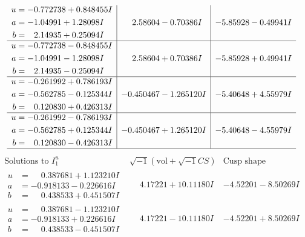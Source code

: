 \documentclass[1p]{elsarticle_modified}
\theoremstyle{definition}
\newcommand{\I}{\sqrt{-1}}
\begin{document}
$$\begin{array}{c|c|c}
\begin{aligned}
u &= -0.772738 + 0.848455 I \\
a &= -1.04991 + 1.28098 I \\
b &= \phantom{-}2.14935 + 0.25094 I\end{aligned}
 & \phantom{-}2.58604 - 0.70386 I & -5.85928 - 0.49941 I \\ \hline\begin{aligned}
u &= -0.772738 - 0.848455 I \\
a &= -1.04991 - 1.28098 I \\
b &= \phantom{-}2.14935 - 0.25094 I\end{aligned}
 & \phantom{-}2.58604 + 0.70386 I & -5.85928 + 0.49941 I \\ \hline\begin{aligned}
u &= -0.261992 + 0.786193 I \\
a &= -0.562785 - 0.125344 I \\
b &= \phantom{-}0.120830 + 0.426313 I\end{aligned}
 & -0.450467 - 1.265120 I & -5.40648 + 4.55979 I \\ \hline\begin{aligned}
u &= -0.261992 - 0.786193 I \\
a &= -0.562785 + 0.125344 I \\
b &= \phantom{-}0.120830 - 0.426313 I\end{aligned}
 & -0.450467 + 1.265120 I & -5.40648 - 4.55979 I\\
 \hline 
 \end{array}$$\newpage$$\begin{array}{c|c|c}  
\text{Solutions to }I^u_{1}& \I (\text{vol} + \sqrt{-1}CS) & \text{Cusp shape}\\
 \hline 
\begin{aligned}
u &= \phantom{-}0.387681 + 1.123210 I \\
a &= -0.918133 - 0.226616 I \\
b &= \phantom{-}0.438533 + 0.451507 I\end{aligned}
 & \phantom{-}4.17221 + 10.11180 I & -4.52201 - 8.50269 I \\ \hline\begin{aligned}
u &= \phantom{-}0.387681 - 1.123210 I \\
a &= -0.918133 + 0.226616 I \\
b &= \phantom{-}0.438533 - 0.451507 I\end{aligned}
 & \phantom{-}4.17221 - 10.11180 I & -4.52201 + 8.50269 I \\ \hline\begin{aligned}

\end{aligned}
\end{array}$$
\end{document}
